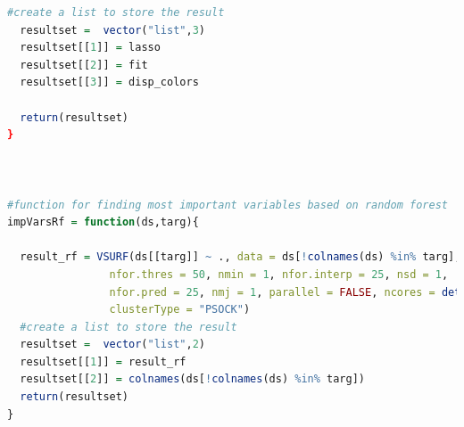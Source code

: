 \documentclass[11pt]{article}
\begin{document}
\begin{lstlisting}[language= R]
  #create a list to store the result
  resultset =  vector("list",3)
  resultset[[1]] = lasso
  resultset[[2]] = fit
  resultset[[3]] = disp_colors
  
  return(resultset)
}



#function for finding most important variables based on random forest  
impVarsRf = function(ds,targ){

  result_rf = VSURF(ds[[targ]] ~ ., data = ds[!colnames(ds) %in% targ], ntree = 2000,
                nfor.thres = 50, nmin = 1, nfor.interp = 25, nsd = 1,
                nfor.pred = 25, nmj = 1, parallel = FALSE, ncores = detectCores() - 1,
                clusterType = "PSOCK")
  #create a list to store the result
  resultset =  vector("list",2)  
  resultset[[1]] = result_rf
  resultset[[2]] = colnames(ds[!colnames(ds) %in% targ])
  return(resultset)
}

\end{lstlisting}
\end{document}
